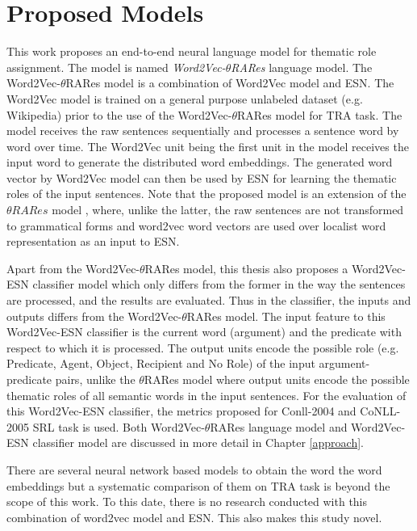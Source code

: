 \section{Proposed Models}

This work proposes an end-to-end neural language model for thematic role assignment. The model is named  \textit{Word2Vec-$\theta$RARes} language model. The Word2Vec-$\theta$RARes model is a combination of Word2Vec model and ESN. The Word2Vec model is trained on a general purpose unlabeled dataset (e.g. Wikipedia) prior to the use of the Word2Vec-$\theta$RARes model for TRA task. The model receives the raw sentences sequentially and processes a sentence word by word over time. The Word2Vec unit being the first unit in the model receives the input word to generate the distributed word embeddings. The generated word vector by Word2Vec model can then be used by ESN for learning the thematic roles of the input sentences. Note that the proposed model is an extension of the $\theta RARes$ model \cite{xavier:2013:RT}, where, unlike the latter, the raw sentences are not transformed to grammatical forms and word2vec word vectors are used over localist word representation as an input to ESN. 

Apart from the Word2Vec-$\theta$RARes model, this thesis also proposes a Word2Vec-ESN classifier model which only differs from the former in the way the sentences are processed, and the results are evaluated. Thus in the classifier, the inputs and outputs differs from the Word2Vec-$\theta$RARes model. The input feature to this Word2Vec-ESN classifier is the current word (argument) and the predicate with respect to which it is processed. The output units encode the possible role (e.g. Predicate, Agent, Object, Recipient and No Role) of the input argument-predicate pairs, unlike the $\theta$RARes model where output units encode the possible thematic roles of all semantic words in the input sentences. For the evaluation of this Word2Vec-ESN classifier, the metrics proposed for Conll-2004 \cite{conll:2004} and CoNLL-2005 \cite{conll:2005} SRL task is used. Both Word2Vec-$\theta$RARes language model and Word2Vec-ESN classifier model are discussed in more detail in Chapter \ref{approach}.

There are several neural network based models to obtain the word the word embeddings \cite{w2v:glove, srl:collobert:2008, word_vec:turian:2010, word_vec:hinton:2009} but a systematic comparison of them on TRA task is beyond the scope of this work. To this date, there is no research conducted with this combination of word2vec model and ESN. This also makes this study novel.


